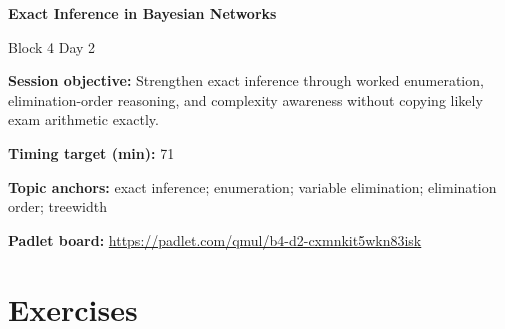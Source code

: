 \documentclass[11pt]{article}
\begin{document}
\begin{center}\LARGE\bfseries Exact Inference in Bayesian Networks\end{center}

\begin{center}\large Block 4 Day 2\end{center}

\begin{tcolorbox}[colback=MidnightBlue!4,colframe=MidnightBlue,title={Session Overview},fonttitle=\bfseries,breakable]
\textbf{Session objective:} Strengthen exact inference through worked enumeration, elimination-order reasoning, and complexity awareness without copying likely exam arithmetic exactly.

\textbf{Timing target (min):} 71

\textbf{Topic anchors:} exact inference; enumeration; variable elimination; elimination order; treewidth

\textbf{Padlet board:} \url{https://padlet.com/qmul/b4-d2-cxmnkit5wkn83isk}
\end{tcolorbox}

\section*{Exercises}
\end{document}
